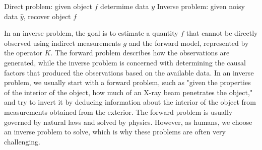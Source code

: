 \documentclass{article}
\begin{document}
\begin{center}
\newline
Direct problem: given object $f$ determime data $y$
\newline
Inverse problem: given noisy data $ \hat{y}$, recover object $f$
\end{center}
In an inverse problem, the goal is to estimate a quantity $f$ that cannot be directly observed using indirect measurements $g$ and the forward model, represented by the operator $K$. The forward problem describes how the observations are generated, while the inverse problem is concerned with determining the causal factors that produced the observations based on the available data.
\newline
In an inverse problem, we usually start with a forward problem, such as "given the properties of the interior of the object, how much of an X-ray beam penetrates the object," and try to invert it by deducing information about the interior of the object from measurements obtained from the exterior.
\newline
The forward problem is usually governed by natural laws and solved by physics. However, as humans, we choose an inverse problem to solve, which is why these problems are often very challenging.
\newline
\end{document}
